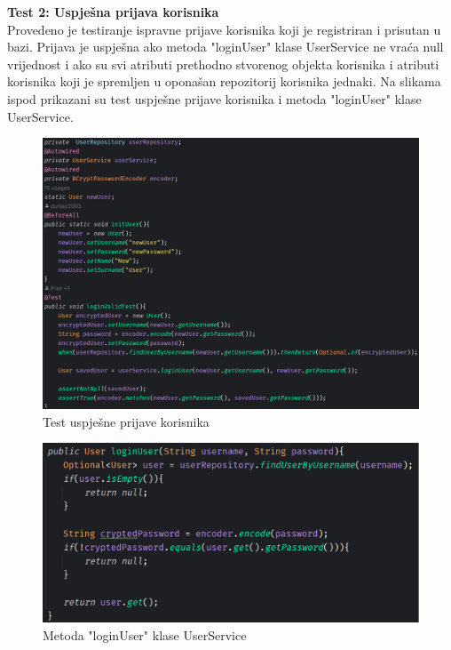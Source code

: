 \textbf{Test 2: Uspješna prijava korisnika} \\
Provedeno je testiranje ispravne prijave korisnika koji je registriran i prisutan u bazi. Prijava je uspješna ako metoda "loginUser" klase UserService ne vraća null vrijednost i ako su svi atributi prethodno stvorenog objekta korisnika i atributi korisnika koji je spremljen u oponašan repozitorij korisnika jednaki. Na slikama ispod prikazani su test uspješne prijave korisnika i metoda "loginUser" klase UserService.

				\begin{figure}[H]
			\includegraphics[scale=0.4]{slike/loginValidTest.PNG} %
			\centering
			\caption{Test uspješne prijave korisnika}
			\label{Test uspješne prijave korisnika}
		\end{figure}
		
						\begin{figure}[H]
			\includegraphics[scale=0.4]{slike/loginUser.PNG} %
			\centering
			\caption{Metoda "loginUser" klase UserService}
			\label{Metoda "loginUser" klase UserService}
		\end{figure}
		
